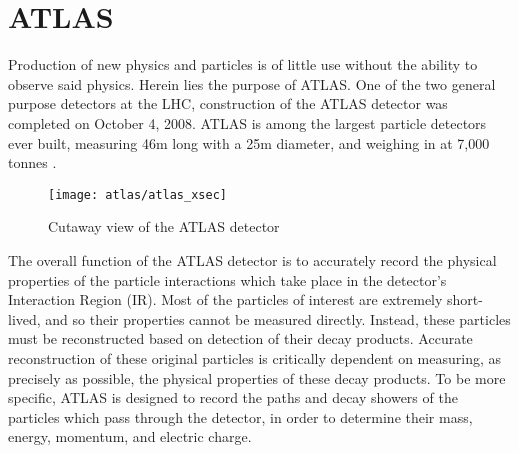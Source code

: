 



\chapter{ATLAS} 
    Production of new physics and particles is of little use without the ability to observe said physics.
    Herein lies the purpose of ATLAS.
    One of the two general purpose detectors at the LHC, construction of the ATLAS detector was completed on October 4, 2008.
    ATLAS is among the largest particle detectors ever built, measuring 46m long with a 25m diameter, and weighing in at 7,000 tonnes \cite{atlas_website}.

    \begin{figure}[h]
        \texttt{[image: atlas/atlas\_xsec]}
        \caption{Cutaway view of the ATLAS detector \cite{Pequenao:1095924}}
        \label{fig:atlas_xsec}
    \end{figure}


    The overall function of the ATLAS detector is to accurately record the physical properties of the particle interactions which take place in the detector's Interaction Region (IR).
    Most of the particles of interest are extremely short-lived, and so their properties cannot be measured directly.
    Instead, these particles must be reconstructed based on detection of their decay products.
    Accurate reconstruction of these original particles is critically dependent on measuring, as precisely as possible, the physical properties of these decay products.
    To be more specific, ATLAS is designed to record the paths and decay showers of the particles which pass through the detector, in order to determine their mass, energy, momentum, and electric charge.

